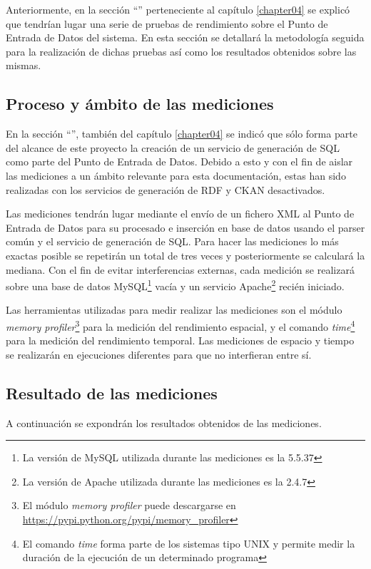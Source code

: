 Anteriormente, en la sección ``'' perteneciente al capítulo \ref{chapter04} se explicó que tendrían lugar una serie de pruebas de rendimiento sobre el Punto de Entrada de Datos del sistema.  En esta sección se detallará la metodología seguida para la realización de dichas pruebas así como los resultados obtenidos sobre las mismas.


\subsection{Proceso y ámbito de las mediciones}
\label{pruebas:proceso_ambito_mediciones}
	En la sección ``'', también del capítulo \ref{chapter04} se indicó que sólo forma parte del alcance de este proyecto la creación de un servicio de generación de SQL como parte del Punto de Entrada de Datos.  Debido a esto y con el fin de aislar las mediciones a un ámbito relevante para esta documentación, estas han sido realizadas con los servicios de generación de RDF y CKAN desactivados.
	
	Las mediciones tendrán lugar mediante el envío de un fichero XML al Punto de Entrada de Datos para su procesado e inserción en base de datos usando el parser común y el servicio de generación de SQL.  Para hacer las mediciones lo más exactas posible se repetirán un total de tres veces y posteriormente se calculará la mediana.  Con el fin de evitar interferencias externas, cada medición se realizará sobre una base de datos MySQL\footnote{La versión de MySQL utilizada durante las mediciones es la 5.5.37} vacía y un servicio Apache\footnote{La versión de Apache utilizada durante las mediciones es la 2.4.7} recién iniciado.
	
	Las herramientas utilizadas para medir realizar las mediciones son el módulo \textit{memory profiler}\footnote{El módulo \textit{memory profiler} puede descargarse en \url{https://pypi.python.org/pypi/memory_profiler}} para la medición del rendimiento espacial, y el comando \textit{time}\footnote{El comando \textit{time} forma parte de los sistemas tipo UNIX y permite medir la duración de la ejecución de un determinado programa} para la medición del rendimiento temporal.  Las mediciones de espacio y tiempo se realizarán en ejecuciones diferentes para que no interfieran entre sí.
	

\subsection{Resultado de las mediciones}
	A continuación se expondrán los resultados obtenidos de las mediciones.  
	
